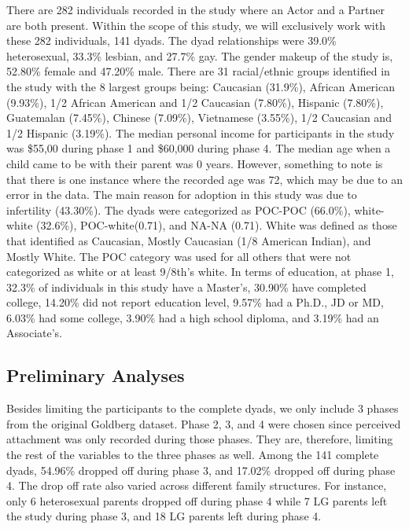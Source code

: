 \documentclass[man]{apa6}
\begin{document}
There are 282 individuals recorded in the study where an Actor and a Partner are both present. Within the scope of this study, we will exclusively work with these 282 individuals, 141 dyads.
The dyad relationships were 39.0\% heterosexual, 33.3\% lesbian, and 27.7\% gay.
The gender makeup of the study is, 52.80\% female and 47.20\% male.
There are 31 racial/ethnic groups identified in the study with the 8 largest groups being: Caucasian (31.9\%), African American (9.93\%), 1/2 African American and 1/2 Caucasian (7.80\%), Hispanic (7.80\%), Guatemalan (7.45\%), Chinese (7.09\%), Vietnamese (3.55\%), 1/2 Caucasian and 1/2 Hispanic (3.19\%).
The median personal income for participants in the study was \$55,00 during phase 1 and \$60,000 during phase 4.
The median age when a child came to be with their parent was 0 years. However, something to note is that there is one instance where the recorded age was 72, which may be due to an error in the data.
The main reason for adoption in this study was due to infertility (43.30\%).
The dyads were categorized as POC-POC (66.0\%), white-white (32.6\%), POC-white(0.71), and NA-NA (0.71). White was defined as those that identified as Caucasian, Mostly Caucasian (1/8 American Indian), and Mostly White. The POC category was used for all others that were not categorized as white or at least 9/8th's white.
In terms of education, at phase 1, 32.3\% of individuals in this study have a Master's, 30.90\% have completed college, 14.20\% did not report education level, 9.57\% had a Ph.D., JD or MD, 6.03\% had some college, 3.90\% had a high school diploma, and 3.19\% had an Associate's.

\hypertarget{preliminary-analyses}{%
\subsection{Preliminary Analyses}\label{preliminary-analyses}}

Besides limiting the participants to the complete dyads, we only include 3 phases from the original Goldberg dataset. Phase 2, 3, and 4 were chosen since perceived attachment was only recorded during those phases. They are, therefore, limiting the rest of the variables to the three phases as well. Among the 141 complete dyads, 54.96\% dropped off during phase 3, and 17.02\% dropped off during phase 4. The drop off rate also varied across different family structures. For instance, only 6 heterosexual parents dropped off during phase 4 while 7 LG parents left the study during phase 3, and 18 LG parents left during phase 4.
\end{document}
